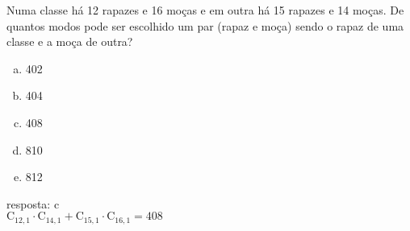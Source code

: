 \begin{ex}
 Numa classe há 12 rapazes e 16 moças e em outra há 15 rapazes e 14 moças. De quantos modos pode ser escolhido um par (rapaz e moça) sendo o rapaz de uma classe e a moça de outra?
    \begin{enumerate}[(a)]
    \item 402
    \item 404
    \item 408
    \item 810
    \item 812
    \end{enumerate}
     \begin{sol}
      resposta: c \\
      $\mathrm{C}_{{12},1}\cdot\mathrm{C}_{{14},1}+\mathrm{C}_{{15},1}\cdot\mathrm{C}_{{16},1}=408$
     \end{sol}
\end{ex}